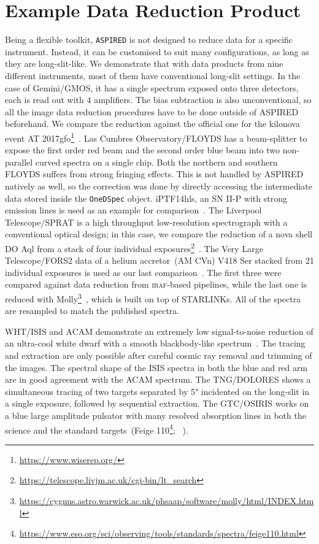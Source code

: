 \documentclass[linenumbers, twocolumn]{aastex631}
\begin{document}
\section{Example Data Reduction Product}
\label{sec:examples}
Being a flexible toolkit, \texttt{ASPIRED} is not designed to reduce data for a
specific instrument. Instead, it can be customised to suit many configurations,
as long as they are long-slit-like. We demonstrate that with data products
from nine different instruments, most of them have conventional long-slit settings.
In the case of Gemini/GMOS, it has a single spectrum exposed onto three detectors,
each is read out with 4 amplifiers. The bias subtraction is also unconventional,
so all the image data reduction procedures have to be done outside of ASPIRED
beforehand. We compare the reduction against the official one for the kilonova
event AT 2017gfo\footnote{\url{https://www.wiserep.org/}}~\citep{2017ApJ...848L..32M}. Las Cumbres
Observatory/FLOYDS has a beam-splitter to expose
the first order red beam and the second order blue beam into two non-parallel
curved spectra on a single chip. Both the northern and southern FLOYDS suffers
from strong fringing effects. This is not handled by ASPIRED natively as well,
so the correction was done by directly accessing the intermediate data stored
inside the \texttt{OneDSpec} object. iPTF14hls, an SN II-P with strong emission
lines is used as an example for comparison~\citep{2017Natur.551..210A}. The Liverpool Telescope/SPRAT is a
high throughput low-resolution spectrograph with a conventional optical design;
in this case, we compare the reduction of a nova shell DO Aql from a stack of
four individual exposures\footnote{\url{https://telescope.livjm.ac.uk/cgi-bin/lt_search}}~\citep{2020MNRAS.499.2959H}. The Very Large Telescope/FORS2 data of a helium
accretor~(AM CVn) V418 Ser stacked from 21 individual exposures is used as our
last comparison~\citep{2020MNRAS.496.1243G}. The first three were compared against data reduction from
\textsc{iraf}-based pipelines, while the last one is reduced with Molly\footnote{\url{https://cygnus.astro.warwick.ac.uk/phsaap/software/molly/html/INDEX.html}}~\citep{2019ascl.soft07012M}, which
is built on top of STARLINKs. All of the spectra are resampled to match the
published spectra.

WHT/ISIS and ACAM demonstrate an extremely low signal-to-noise reduction of an ultra-cool
white dwarf with a smooth blackbody-like spectrum~\citep{2020MNRAS.493.6001L}.
The tracing and extraction are only possible after careful cosmic ray removal
and trimming of the images. The spectral shape of the ISIS spectra in both the
blue and red arm are in good agreement with the ACAM spectrum. The TNG/DOLORES
shows a simultaneous tracing of two targets separated by 5" incidented on the
long-slit in a single exposure, followed by sequential extraction. The
GTC/OSIRIS works on a blue large amplitude pulsator with many resolved
absorption lines in both the science and the standard targets~(Feige
110\footnote{\url{https://www.eso.org/sci/observing/tools/standards/spectra/feige110.html}}; ~\citealp{2022MNRAS.511.4971M}). 
\end{document}
